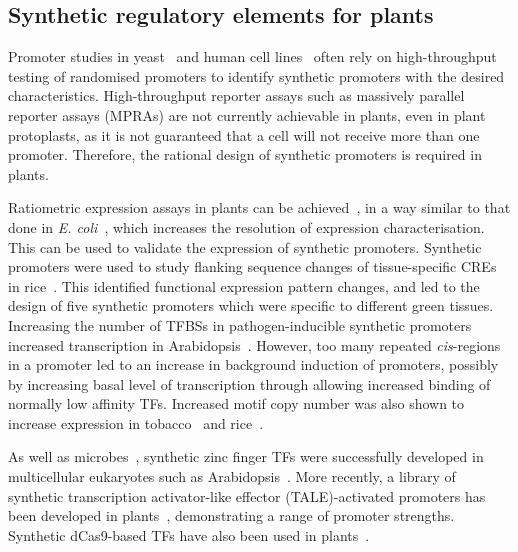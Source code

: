 \documentclass[../main.tex]{subfiles}
\begin{document}
\subsection{Synthetic regulatory elements for plants}\label{chapter1:synthetic-regulatory-elements-for-plants}
Promoter studies in yeast~\autocite{reddenDevelopmentCharacterizationSynthetic2015,boerDecipheringEukaryoticGeneregulatory2019,kotopkaModeldrivenGenerationArtificial2020} and human cell lines~\autocite{mattioliHighthroughputFunctionalAnalysis2019} often rely on high\hyp{}throughput testing of randomised promoters to identify synthetic promoters with the desired characteristics.
High\hyp{}throughput reporter assays such as massively parallel reporter assays (MPRAs) are not currently achievable in plants, even in plant protoplasts, as it is not guaranteed that a cell will not receive more than one promoter.
Therefore, the rational design of synthetic promoters is required in plants.

Ratiometric expression assays in plants can be achieved~\autocite{brucknerLibrarySyntheticTranscription2015}, in a way similar to that done in \textit{E. coli}~\autocite{kellyMeasuringActivityBioBrick2009}, which increases the resolution of expression characterisation.
This can be used to validate the expression of synthetic promoters.
Synthetic promoters were used to study flanking sequence changes of tissue\hyp{}specific CREs in rice~\autocite{wangNovelGreenTissuespecific2015}.
This identified functional expression pattern changes, and led to the design of five synthetic promoters which were specific to different
green tissues.
Increasing the number of TFBSs in pathogen\hyp{}inducible synthetic promoters increased transcription in Arabidopsis~\autocite{rushtonSyntheticPlantPromoters2002}.
However, too many repeated \textit{cis}\hyp{}regions in a promoter led to an increase in background induction of promoters, possibly by increasing basal level of transcription through allowing increased binding of normally low affinity TFs.
Increased motif copy number was also shown to increase expression in tobacco~\autocite{sawantVarietySynergisticAntagonistic2005} and rice~\autocite{wuGCN4MotifRice1998a}.

As well as microbes~\autocite{khalilSyntheticBiologyFramework2012}, synthetic zinc finger TFs were successfully developed in multicellular eukaryotes such as Arabidopsis~\autocite{guanHeritableEndogenousGene2002}.
More recently, a library of synthetic transcription activator\hyp{}like effector (TALE)\hyp{}activated promoters has been developed in plants~\autocite{brucknerLibrarySyntheticTranscription2015}, demonstrating a range of promoter strengths.
Synthetic dCas9-based TFs have also been used in plants~\autocite{piatekRNAguidedTranscriptionalRegulation2015}.
\end{document}
